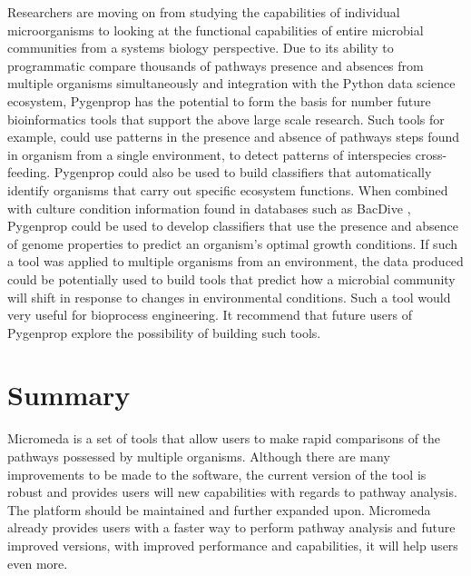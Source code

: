 Researchers are moving on from studying the capabilities of individual microorganisms to looking at the functional capabilities of entire microbial communities from a systems biology perspective. Due to its ability to programmatic compare thousands of pathways presence and absences from multiple organisms simultaneously and integration with the Python data science ecosystem, Pygenprop has the potential to form the basis for number future bioinformatics tools that support the above large scale research. Such tools for example, could use patterns in the presence and absence of pathways steps found in organism from a single environment, to detect patterns of interspecies cross-feeding. Pygenprop could also be used to build classifiers that automatically identify organisms that carry out specific ecosystem functions. When combined with culture condition information found in databases such as BacDive \cite{reimer2018bac}, Pygenprop could be used to develop classifiers that use the presence and absence of genome properties to predict an organism's optimal growth conditions. If such a tool was applied to multiple organisms from an environment, the data produced could be potentially used to  build tools that predict how a microbial community will shift in response to changes in environmental conditions. Such a tool would very useful for bioprocess engineering. It recommend that future users of Pygenprop explore the possibility of building such tools.

\section{Summary}

Micromeda is a set of tools that allow users to make rapid comparisons of the pathways possessed by multiple organisms. Although there are many improvements to be made to the software, the current version of the tool is robust and provides users will new capabilities with regards to pathway analysis. The platform should be maintained and further expanded upon. Micromeda already provides users with a faster way to perform pathway analysis and future improved versions, with improved performance and capabilities, it will help users even more. 